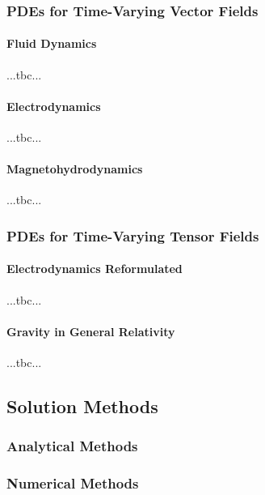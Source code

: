 

% 





\subsubsection{PDEs for Time-Varying Vector Fields}

\paragraph{Fluid Dynamics} ...tbc...



\paragraph{Electrodynamics} ...tbc...

\paragraph{Magnetohydrodynamics} ...tbc...




\subsubsection{PDEs for Time-Varying Tensor Fields}

\paragraph{Electrodynamics Reformulated} ...tbc...

\paragraph{Gravity in General Relativity} ...tbc...





\subsection{Solution Methods}


\subsubsection{Analytical Methods}

\subsubsection{Numerical Methods}




\begin{comment}

\end{comment}